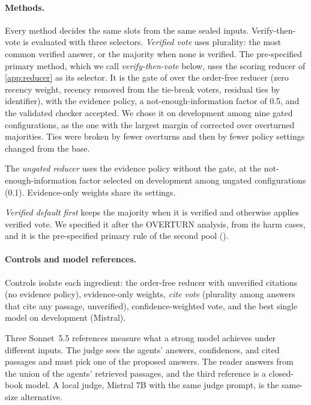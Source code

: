 \paragraph{Methods.} Every method decides the same slots from the same sealed inputs. Verify-then-vote is evaluated with three selectors. \emph{Verified vote} uses plurality: the most common verified answer, or the majority when none is verified. The pre-specified primary method, which we call \emph{verify-then-vote} below, uses the scoring reducer of \cref{app:reducer} as its selector. It is the gate of  over the order-free reducer (zero recency weight, recency removed from the tie-break voters, residual ties by identifier), with the evidence policy, a not-enough-information factor of 0.5, and the validated checker accepted. We chose it on development among nine gated configurations, as the one with the largest margin of corrected over overturned majorities. Ties were broken by fewer overturns and then by fewer policy settings changed from the base.

The \emph{ungated reducer} uses the evidence policy without the gate, at the not-enough-information factor selected on development among ungated configurations (0.1). Evidence-only weights share its settings.

\emph{Verified default first} keeps the majority when it is verified and otherwise applies verified vote. We specified it after the OVERTURN analysis, from its harm cases, and it is the pre-specified primary rule of the second pool ().

\paragraph{Controls and model references.} Controls isolate each ingredient: the order-free reducer with unverified citations (no evidence policy), evidence-only weights, \emph{cite vote} (plurality among answers that cite any passage, unverified), confidence-weighted vote, and the best single model on development (Mistral).

Three Sonnet~5.5 references measure what a strong model achieves under different inputs. The judge sees the agents' answers, confidences, and cited passages and must pick one of the proposed answers. The reader answers from the union of the agents' retrieved passages, and the third reference is a closed-book model. A local judge, Mistral 7B with the same judge prompt, is the same-size alternative.

